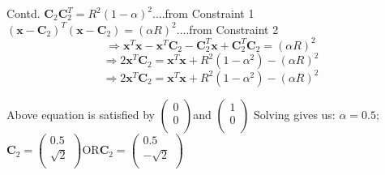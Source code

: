 \documentclass[10pt]{beamer}
\begin{document}
\begin{frame}{Contd.}
\(\textbf{C}_2\textbf{C}_2^{T} = R^2(1-\alpha)^2\)....from Constraint 1 \newline 
\((\textbf{x}-\textbf{C}_2)^{T}(\textbf{x}-\textbf{C}_2) = (\alpha R)^2      \)....from Constraint 2
\[\Rightarrow \textbf{x}^{T}\textbf{x} - \textbf{x}^{T}\textbf{C}_2-\textbf{C}_2^{T}\textbf{x} + \textbf{C}_2^{T}\textbf{C}_2 = (\alpha R)^2
\]
\[\Rightarrow 2\textbf{x}^{T}\textbf{C}_2 = \textbf{x}^{T}\textbf{x} + R^2(1-\alpha^2)-(\alpha R)^2 
\]
\[\Rightarrow 2\textbf{x}^{T}\textbf{C}_2 = \textbf{x}^{T}\textbf{x} + R^2(1-\alpha^2)-(\alpha R)^2 
\]

Above equation is satisfied by  \( \left( {\begin{array}{c}
   0 \\
   0 \\
   \end{array} } \right)\)and \( \left( {\begin{array}{c}
   1 \\
   0 \\
   \end{array} } \right)\) \newline
   Solving gives us: \newline
   \newline
   \(\alpha = 0.5\)\quad;\quad
   \(\textbf{C} _2 =  \left( {\begin{array}{c}
   0.5 \\
   \sqrt{2} \\
   \end{array} } \right)\)\quad OR\quad \(\textbf{C} _2 =  \left( {\begin{array}{c}
   0.5 \\
   -\sqrt{2} \\
   \end{array} } \right)\)
   
 

\end{frame}
\end{document}
